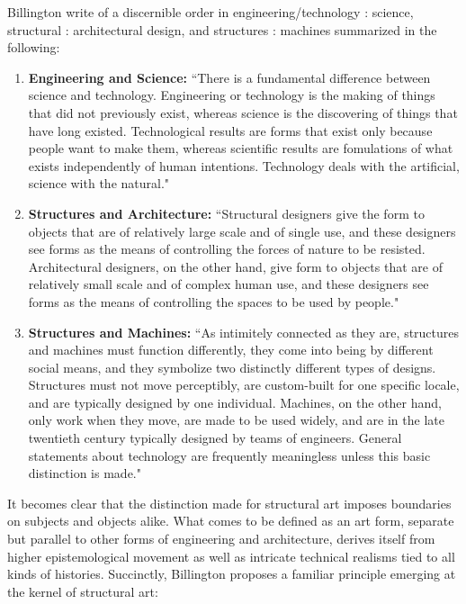 Billington write of a discernible order in engineering/technology : science, structural : architectural design, and structures : machines summarized in the following:

\begin{enumerate}
  \item [] \textbf{Engineering and Science:} ``There is a fundamental difference between science and technology. Engineering or technology is the making of things that did not previously exist, whereas science is the discovering of things that have long existed. Technological results are forms that exist only because people want to make them, whereas scientific results are fomulations of what exists independently of human intentions. Technology deals with the artificial, science with the natural."\cite[p9]{TOWERANDBRIDGE}

  \item [] \textbf{Structures and Architecture:} ``Structural designers give the form to objects that are of relatively large scale and of single use, and these designers see forms as the means of controlling the forces of nature to be resisted. Architectural designers, on the other hand, give form to objects that are of relatively small scale and of complex human use, and these designers see forms as the means of controlling the spaces to be used by people." \cite[14]{TOWERANDBRIDGE}

  \item[] \textbf{Structures and Machines:} ``As intimitely connected as they are, structures and machines must function differently, they come into being by different social means, and they symbolize two distinctly different types of designs. Structures must not move perceptibly, are custom-built for one specific locale, and are typically designed by one individual. Machines, on the other hand, only work when they move, are made to be used widely, and are in the late twentieth century typically designed by teams of engineers. General statements about technology are frequently meaningless unless this basic distinction is made."\cite[p13]{TOWERANDBRIDGE}


\end{enumerate}

It becomes clear that the distinction made for structural art imposes boundaries on subjects and objects alike. What comes to be defined as an art form, separate but parallel to other forms of engineering and architecture, derives itself from higher epistemological movement as well as intricate technical realisms tied to all kinds of histories. Succinctly, Billington proposes a familiar principle emerging at the kernel of structural art:

